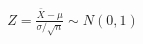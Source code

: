 \documentclass[preview]{standalone}
\begin{document}
\begin{align*}
Z = \frac{\bar{X} - \mu}{\sigma / \sqrt{n}} \sim N(0,1)
\end{align*}
\end{document}

